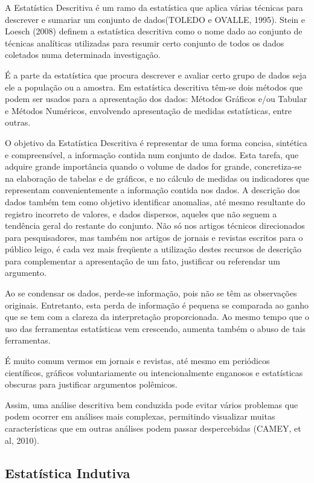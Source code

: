 \documentclass[
  letterpaper,
  DIV=11,
  numbers=noendperiod]{scrreprt}
\begin{document}
A Estatística Descritiva é um ramo da estatística que aplica várias
técnicas para descrever e sumariar um conjunto de dados(TOLEDO e OVALLE,
1995). Stein e Loesch (2008) definem a estatística descritiva como o
nome dado ao conjunto de técnicas analíticas utilizadas para resumir
certo conjunto de todos os dados coletados numa determinada
investigação.

É a parte da estatística que procura descrever e avaliar certo grupo de
dados seja ele a população ou a amostra. Em estatística descritiva
têm-se dois métodos que podem ser usados para a apresentação dos dados:
Métodos Gráficos e/ou Tabular e Métodos Numéricos, envolvendo
apresentação de medidas estatísticas, entre outras.

O objetivo da Estatística Descritiva é representar de uma forma concisa,
sintética e compreensível, a informação contida num conjunto de dados.
Esta tarefa, que adquire grande importância quando o volume de dados for
grande, concretiza-se na elaboração de tabelas e de gráficos, e no
cálculo de medidas ou indicadores que representam convenientemente a
informação contida nos dados. A descrição dos dados também tem como
objetivo identificar anomalias, até mesmo resultante do registro
incorreto de valores, e dados dispersos, aqueles que não seguem a
tendência geral do restante do conjunto. Não só nos artigos técnicos
direcionados para pesquisadores, mas também nos artigos de jornais e
revistas escritos para o público leigo, é cada vez mais freqüente a
utilização destes recursos de descrição para complementar a apresentação
de um fato, justificar ou referendar um argumento.

Ao se condensar os dados, perde-se informação, pois não se têm as
observações originais. Entretanto, esta perda de informação é pequena se
comparada ao ganho que se tem com a clareza da interpretação
proporcionada. Ao mesmo tempo que o uso das ferramentas estatísticas vem
crescendo, aumenta também o abuso de tais ferramentas.

É muito comum vermos em jornais e revistas, até mesmo em periódicos
científicos, gráficos voluntariamente ou intencionalmente enganosos e
estatísticas obscuras para justificar argumentos polêmicos.

Assim, uma análise descritiva bem conduzida pode evitar vários problemas
que podem ocorrer em análises mais complexas, permitindo visualizar
muitas características que em outras análises podem passar despercebidas
(CAMEY, et al, 2010).

\hypertarget{estatuxedstica-indutiva}{%
\subsection{Estatística Indutiva}\label{estatuxedstica-indutiva}}
\end{document}
